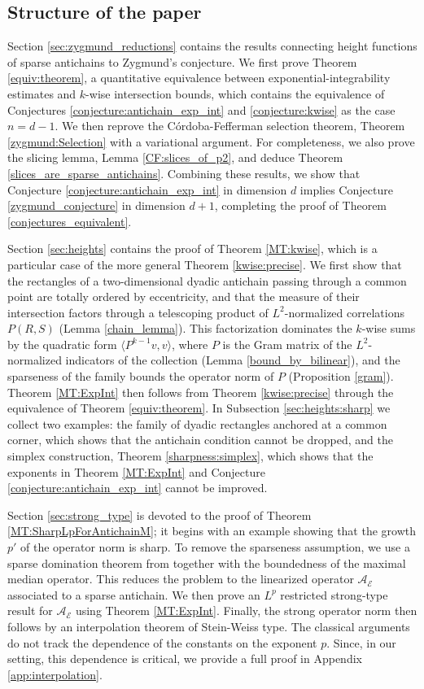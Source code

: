 \documentclass[oneside]{amsart}
\theoremstyle{definition}
\theoremstyle{plain}
\numberwithin{equation}{section}
\numberwithin{theorem}{section}
\begin{document}
\subsection{Structure of the paper}

Section \ref{sec:zygmund_reductions} contains the results connecting height
functions of sparse antichains to Zygmund's conjecture.
We first prove Theorem \ref{equiv:theorem}, a quantitative equivalence between
exponential-integrability estimates and $k$-wise intersection bounds, which
contains the equivalence of Conjectures \ref{conjecture:antichain_exp_int} and
\ref{conjecture:kwise} as the case $n = d-1$.
We then reprove the Córdoba-Fefferman selection theorem, Theorem
\ref{zygmund:Selection} with a variational argument.
For completeness, we also prove the slicing lemma, Lemma \ref{CF:slices_of_p2},
and deduce Theorem \ref{slices_are_sparse_antichains}.
Combining these results, we show that Conjecture
\ref{conjecture:antichain_exp_int} in dimension $d$ implies Conjecture
\ref{zygmund_conjecture} in dimension $d+1$, completing the proof of Theorem
\ref{conjectures_equivalent}.

Section \ref{sec:heights} contains the proof of Theorem \ref{MT:kwise}, which is
a particular case of the more general Theorem \ref{kwise:precise}.
We first show that the rectangles of a two-dimensional dyadic antichain
passing through a common point are totally ordered by eccentricity, and that
the measure of their intersection factors through a telescoping product of
$L^2$-normalized correlations $P(R,S)$ (Lemma \ref{chain_lemma}).
This factorization dominates the $k$-wise sums by the quadratic form
$\langle P^{k-1}v, v \rangle$, where $P$ is the Gram matrix of the
$L^2$-normalized indicators of the collection
(Lemma \ref{bound_by_bilinear}), and the sparseness of the family
bounds the operator norm of $P$ (Proposition \ref{gram}).
Theorem \ref{MT:ExpInt} then follows from Theorem \ref{kwise:precise} through
the equivalence of Theorem \ref{equiv:theorem}.
In Subsection \ref{sec:heights:sharp} we collect two examples: the family of
dyadic rectangles anchored at a common corner, which shows that the antichain
condition cannot be dropped, and the simplex construction, Theorem
\ref{sharpness:simplex}, which shows that the exponents in Theorem
\ref{MT:ExpInt} and Conjecture \ref{conjecture:antichain_exp_int} cannot be
improved.

Section \ref{sec:strong_type} is devoted to the proof of Theorem
\ref{MT:SharpLpForAntichainM}; it begins with an example showing that the
growth $p'$ of the operator norm is sharp.
To remove the sparseness assumption, we use a sparse domination theorem from
\cite{CLR2026} together with the boundedness of the maximal median operator.
This reduces the problem to the linearized operator
$\mathcal{A}_{\mathcal{E}}$ associated to a sparse antichain.
We then prove an $L^p$ restricted strong-type result for
$\mathcal{A}_{\mathcal{E}}$
using Theorem \ref{MT:ExpInt}.
Finally, the strong operator norm then follows by an interpolation theorem of
Stein-Weiss type.
The classical arguments do not track the dependence of the constants on the
exponent $p$.
Since, in our setting, this dependence is critical, we provide a full proof in
Appendix \ref{app:interpolation}.
\end{document}
